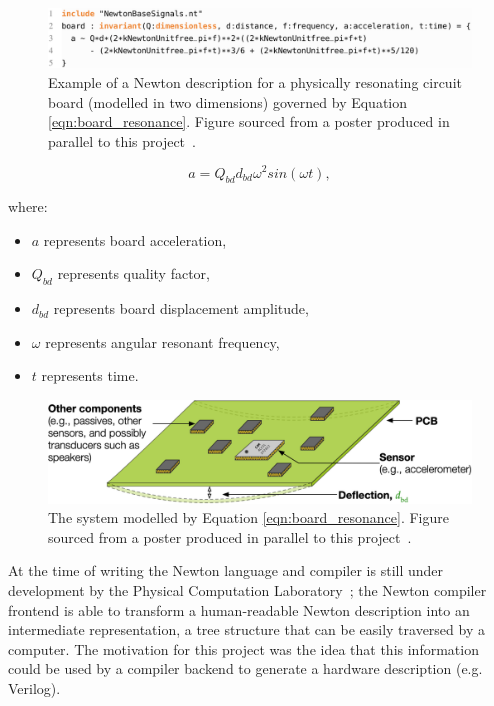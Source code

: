 \documentclass[12pt]{article}
\begin{document}
    \begin{figure}[H]
      \centering
      \includegraphics[width=\textwidth]{fig/newton_description.png}
      \caption{Example of a Newton description for a physically resonating circuit board (modelled in two dimensions) governed by Equation \ref{eqn:board_resonance}. Figure sourced from a poster produced in parallel to this project~\cite{eurosys_poster}.}
      \label{fig:newton_description}
    \end{figure}

    \begin{equation}
      a = Q_{bd} d_{bd} \omega^2sin(\omega t),
      \label{eqn:board_resonance}
    \end{equation}

    where:
    \begin{itemize}
      \item $a$ represents board acceleration,
      \item $Q_{bd}$ represents quality factor,
      \item $d_{bd}$ represents board displacement amplitude,
      \item $\omega$ represents angular resonant frequency,
      \item $t$ represents time.
    \end{itemize}

    \begin{figure}[H]
      \centering
      \includegraphics[width=\textwidth]{fig/resonating_board.png}
      \caption{The system modelled by Equation \ref{eqn:board_resonance}. Figure sourced from a poster produced in parallel to this project~\cite{eurosys_poster}.}
      \label{fig:resonating_board}
    \end{figure}

    At the time of writing the Newton language and compiler is still under development by the Physical Computation Laboratory~\cite{physcomp}; the Newton compiler frontend is able to transform a human-readable Newton description into an intermediate representation, a tree structure that can be easily traversed by a computer. The motivation for this project was the idea that this information could be used by a compiler backend to generate a hardware description (e.g. Verilog).\\
\end{document}
